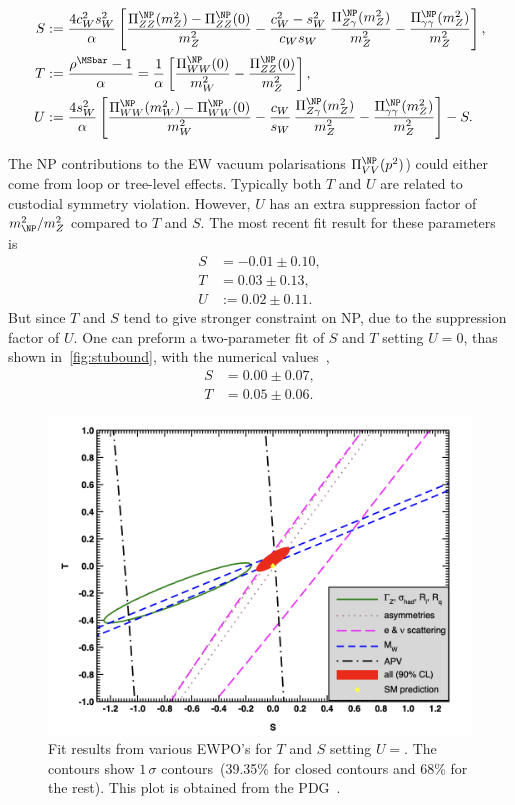  \begin{tcolorbox}[title=The oblique parameters,
	title filled=false,
	colback=Mahogany!5!white,
	colframe=Mahogany]
\begin{align}
	S &:=\frac{4 c_W^2 s_W^2}{\alpha} \left[ \frac{\Pi_{ZZ}^{\NP} (m_Z^2)- \Pi_{ZZ}^{\NP} (0)}{m_Z^2}  - \frac{c_W^2-s_W^2}{c_Ws_W}\,\frac{\Pi_{Z\gamma}^\NP(m_Z^2)}{m_Z^2}-\frac{\Pi_{\gamma\gamma}^\NP(m_Z^2)}{m_Z^2}\right],  \nonumber \\
	T &:=\frac{\rho^{\MSbar}-1}{\alpha}  = \frac{1}{\alpha} \left[ \frac{\Pi^\NP_{WW}(0)}{m_W^2}- \frac{\Pi^\NP_{ZZ}(0)}{m_Z^2} \right] , \\
	U&:= \frac{4 s_W^2}{\alpha} \left[ \frac{\Pi_{WW}^{\NP} (m_W^2)- \Pi_{WW}^{\NP} (0)}{m_W^2}   - \frac{c_W}{s_W}\,\frac{\Pi_{Z\gamma}^\NP(m_Z^2)}{m_Z^2}-\frac{\Pi_{\gamma\gamma}^\NP(m_Z^2)}{m_Z^2}\right] -S .\nonumber 
\end{align}
\end{tcolorbox}
The NP contributions to the EW vacuum polarisations $\Pi_{VV}^{\NP}(p^2)$) could either come from loop or tree-level effects. Typically both $T$ and $U$ are related to custodial symmetry violation. However, $U$ has an extra suppression factor of $m_\NP^2/m_Z^2$ compared to $T$ and $S$. The most recent fit result for these parameters is~\cite{Zyla:2020zbs}
\begin{align}
	S &=-0.01\pm0.10,  \nonumber \\
	T &= 0.03\pm0.13, \\
	U&:= 0.02\pm0.11.\nonumber 
\end{align}
But since $T$ and $S$ tend to give stronger constraint on NP, due to the suppression factor of $U$. One can preform a two-parameter fit of $S$ and $T$ setting $U=0$, thas shown in~\autoref{fig:stubound}, with the numerical values~\cite{Zyla:2020zbs}, \\
 \begin{align}
 	S &=0.00\pm0.07,  \nonumber \\
 	T &= 0.05\pm0.06.
 \end{align}
\begin{figure}[t]
	\centering
	\includegraphics[width=0.65\linewidth]{./figures/stu-pdg}
	\caption{ Fit results from various EWPO's for $T$ and $S$ setting $U=$. The contours show $1\,\sigma$ contours~(39.35\% for closed contours and 68\% for the rest). This plot is obtained from the PDG~\cite{Zyla:2020zbs}.  }  \label{fig:stubound}
\end{figure}
